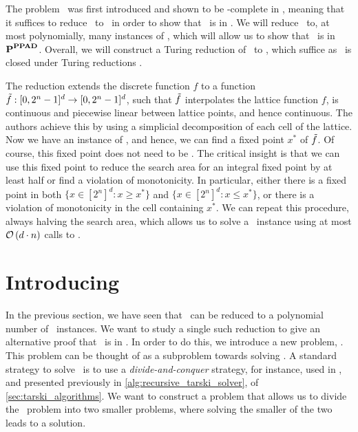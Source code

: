 The problem \Brouwer\ was first introduced and shown to be \PPAD-complete in , meaning that it suffices to reduce \Tarski\ to \Brouwer\ in order to show that \Tarski\ is in \PPAD. We will reduce \Tarski\ to, at most polynomially, many instances of \Brouwer, which will allow us to show that \Tarski\ is in $\textbf{P}^{\textbf{PPAD}}$. Overall, we will construct a Turing reduction of \Tarski\ to \Brouwer, which suffice as \PPAD\ is closed under Turing reductions .

The reduction extends the discrete function $f$ to a function $\Tilde{f} : [0, 2^n - 1]^d \rightarrow [0, 2^n - 1]^d$, such that $\Tilde{f}$ interpolates the lattice function $f$, is continuous and piecewise linear between lattice points, and hence continuous. The authors achieve this by using a simplicial decomposition of each cell of the lattice. Now we have an instance of \Brouwer, and hence, we can find a fixed point $x^*$ of $\Tilde{f}$. Of course, this fixed point does not need to be 
.
The critical insight is that we can use this fixed point to reduce the search area for an integral fixed point by at least half or find a violation of monotonicity. In particular, either there is a fixed point in both $\{x \in [2^n]^d : x \geq x^*\}$ and $\{x \in [2^n]^d : x \leq x^*\}$, or there is a violation of monotonicity in the cell containing $x^*$.
We can repeat this procedure, always halving the search area, which allows us to solve a \Tarski\ instance using at most $\mathcal{O}\left(d \cdot n\right)$ calls to \Brouwer.

\section{Introducing \Tarskistar}

In the previous section, we have seen that \Tarski\ can be reduced to a polynomial number of \Brouwer\ instances. We want to study a single such reduction to give an alternative proof that \Tarski\ is in \PPAD. In order to do this, we introduce a new problem, \Tarskistar. This problem can be thought of as a subproblem towards solving \Tarski. A standard strategy to solve \Tarski\ is to use a \emph{divide-and-conquer} strategy, for instance, used in , and presented previously in \cref{alg:recursive_tarski_solver}, of \cref{sec:tarski_algorithms}. We want to construct a problem that allows us to divide the \Tarski\ problem into two smaller problems, where solving the smaller of the two leads to a solution.

